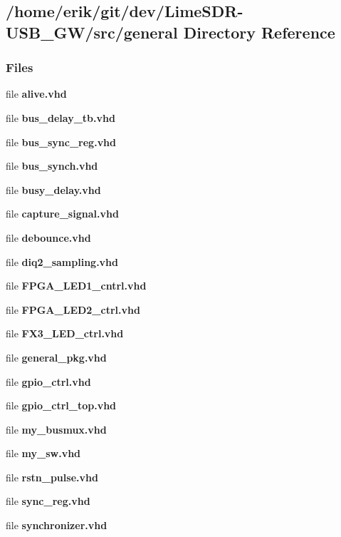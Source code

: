 \subsection{/home/erik/git/dev/\+Lime\+S\+D\+R-\/\+U\+S\+B\+\_\+\+G\+W/src/general Directory Reference}
\label{dir_e5aa234b7e6e15b07b27586548643e78}
\subsubsection*{Files}
\begin{DoxyCompactItemize}
\item 
file {\bf alive.\+vhd}
\item 
file {\bf bus\+\_\+delay\+\_\+tb.\+vhd}
\item 
file {\bf bus\+\_\+sync\+\_\+reg.\+vhd}
\item 
file {\bf bus\+\_\+synch.\+vhd}
\item 
file {\bf busy\+\_\+delay.\+vhd}
\item 
file {\bf capture\+\_\+signal.\+vhd}
\item 
file {\bf debounce.\+vhd}
\item 
file {\bf diq2\+\_\+sampling.\+vhd}
\item 
file {\bf F\+P\+G\+A\+\_\+\+L\+E\+D1\+\_\+cntrl.\+vhd}
\item 
file {\bf F\+P\+G\+A\+\_\+\+L\+E\+D2\+\_\+ctrl.\+vhd}
\item 
file {\bf F\+X3\+\_\+\+L\+E\+D\+\_\+ctrl.\+vhd}
\item 
file {\bf general\+\_\+pkg.\+vhd}
\item 
file {\bf gpio\+\_\+ctrl.\+vhd}
\item 
file {\bf gpio\+\_\+ctrl\+\_\+top.\+vhd}
\item 
file {\bf my\+\_\+busmux.\+vhd}
\item 
file {\bf my\+\_\+sw.\+vhd}
\item 
file {\bf rstn\+\_\+pulse.\+vhd}
\item 
file {\bf sync\+\_\+reg.\+vhd}
\item 
file {\bf synchronizer.\+vhd}
\end{DoxyCompactItemize}
